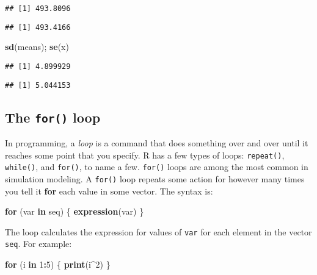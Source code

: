 \documentclass[]{book}
\newenvironment{Shaded}{\begin{snugshade}}{\end{snugshade}}
\newcommand{\KeywordTok}[1]{\textcolor[rgb]{0.13,0.29,0.53}{\textbf{#1}}}
\newcommand{\DecValTok}[1]{\textcolor[rgb]{0.00,0.00,0.81}{#1}}
\newcommand{\ControlFlowTok}[1]{\textcolor[rgb]{0.13,0.29,0.53}{\textbf{#1}}}
\newcommand{\OperatorTok}[1]{\textcolor[rgb]{0.81,0.36,0.00}{\textbf{#1}}}
\newcommand{\NormalTok}[1]{#1}
\theoremstyle{definition}
\theoremstyle{definition}
\theoremstyle{definition}
\theoremstyle{remark}
\begin{document}
\begin{verbatim}
## [1] 493.8096
\end{verbatim}

\begin{verbatim}
## [1] 493.4166
\end{verbatim}

\begin{Shaded}
\begin{Highlighting}[]
\KeywordTok{sd}\NormalTok{(means); }\KeywordTok{se}\NormalTok{(x)}
\end{Highlighting}
\end{Shaded}

\begin{verbatim}
## [1] 4.899929
\end{verbatim}

\begin{verbatim}
## [1] 5.044153
\end{verbatim}

\subsection{\texorpdfstring{The \texttt{for()}
loop}{The for() loop}}\label{for-loops}

In programming, a \emph{loop} is a command that does something over and
over until it reaches some point that you specify. R has a few types of
loops: \texttt{repeat()}, \texttt{while()}, and \texttt{for()}, to name
a few. \texttt{for()} loops are among the most common in simulation
modeling. A \texttt{for()} loop repeats some action for however many
times you tell it \textbf{for} each value in some vector. The syntax is:

\begin{Shaded}
\begin{Highlighting}[]
\ControlFlowTok{for}\NormalTok{ (var }\ControlFlowTok{in}\NormalTok{ seq) \{}
  \KeywordTok{expression}\NormalTok{(var)}
\NormalTok{\}}
\end{Highlighting}
\end{Shaded}

The loop calculates the expression for values of \texttt{var} for each
element in the vector \texttt{seq}. For example:

\begin{Shaded}
\begin{Highlighting}[]
\ControlFlowTok{for}\NormalTok{ (i }\ControlFlowTok{in} \DecValTok{1}\OperatorTok{:}\DecValTok{5}\NormalTok{) \{}
  \KeywordTok{print}\NormalTok{(i}\OperatorTok{^}\DecValTok{2}\NormalTok{)}
\NormalTok{\}}
\end{Highlighting}
\end{Shaded}
\end{document}
